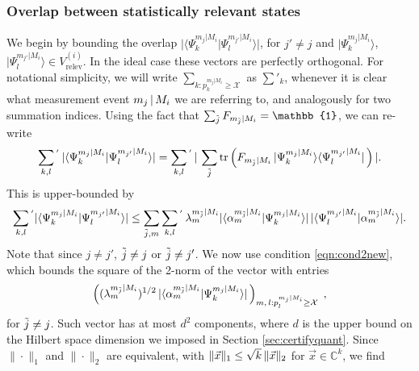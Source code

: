 \subsubsection{Overlap between statistically relevant states}
\label{sec:boundingoverlap}
We begin by bounding the overlap $\vert \langle \Psi_k^{m_j\vert M_i}\vert \Psi_l^{m_{j'}\vert M_i}\rangle \vert$, for $j'\neq j$ and $\vert \Psi_k^{m_j\vert M_i}\rangle$, $\vert \Psi_l^{m_{j'}\vert M_i}\rangle \in V_{\text{relev}}^{(i)}$. In the ideal case these vectors are perfectly orthogonal. For notational simplicity, we will write $\sum_{k:p_k^{m_j\vert M_i}\geq \mathcal{X}}$ as $\sum'_k$, whenever it is clear what measurement event $m_j\thinspace\vert\thinspace M_i$ we are referring to, and analogously for two summation indices.
Using the fact that $\sum_{\Tilde{j}}F_{m_{\Tilde{j}}\vert M_i}=\mathbb{1}$, we can re-write
\begin{equation*}
\sum_{k,l}{}^{'}\thinspace\vert\langle \Psi_k^{m_j\vert M_i} \vert \Psi_l^{m_{j'}\vert M_i}\rangle \vert = \sum_{k,l}{}^{'}\thinspace \vert \thinspace\sum_{\Tilde{j}} \operatorname{tr}\left(F_{m_{\Tilde{j}}\vert M_i}\thinspace\vert \Psi_k^{m_j\vert M_i}\rangle\langle \Psi_l^{m_{j'}\vert M_i}\vert\thinspace\right) \vert.
\end{equation*}
This is upper-bounded by
\begin{equation*}
\sum_{k,l}{}^{'}\vert\langle \Psi_k^{m_j\vert M_i} \vert \Psi_l^{m_{j'}\vert M_i}\rangle \vert \leq \sum_{\Tilde{j},m}\sum_{k,l}{}^{'}\thinspace\lambda_m^{m_{\Tilde{j}}\vert M_i}\vert \langle \alpha_m^{m_{\Tilde{j}}\vert M_i} \vert \Psi_k^{m_j\vert M_i} \rangle \vert \thinspace \vert \langle \Psi_l^{m_{j'}\vert M_i}\vert \alpha_m^{m_{\Tilde{j}}\vert M_i} \rangle \vert.
\end{equation*}
Note that since $j\neq j'$, $\Tilde{j}\neq j$ or $\Tilde{j}\neq j'$. We now use condition \ref{eqn:cond2new}, which bounds the square of the 2-norm of the vector with entries
\begin{equation*}
\left((\lambda_m^{m_{\Tilde{j}}\vert M_i})^{1/2}\thinspace \vert \langle \alpha_m^{m_{\Tilde{j}}\vert M_i}\vert \Psi_k^{m_j\vert M_i}\rangle \vert\thinspace\right)_{m,\thinspace l:p_l^{m_j\vert M_i}\geq \mathcal{X}}\;,
\end{equation*} 
for $\Tilde{j}\neq j$. Such vector has at most $d^2$ components, where $d$ is the upper bound on the Hilbert space dimension we imposed in Section \ref{sec:certifyquant}. Since $\|\cdot\|_1$ and $\|\cdot\|_2$ are equivalent, with $\|\vec{x}\|_1\leq \sqrt{k}\thinspace\|\vec{x}\|_2$ for $\vec{x}\in\mathbb{C}^k$, we find
